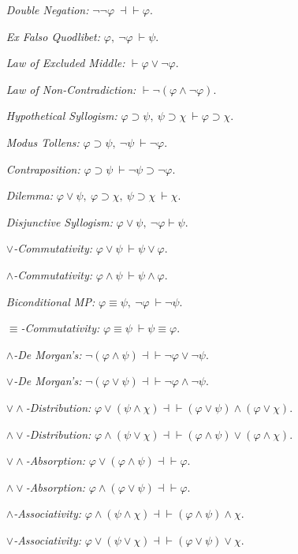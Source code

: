 \documentclass[a4paper, 11pt]{article} %
\begin{document}
\begin{enumerate}[leftmargin=1.5in]
  \item[\it Double Negation:] $\neg\neg\varphi\ \dashv\vdash \varphi$.
  \item[\it Ex Falso Quodlibet:] $\varphi,\ \neg\varphi\ \vdash \psi$.
  \item[\it Law of Excluded Middle:] $\vdash \varphi\vee\neg\varphi$.
  \item[\it Law of Non-Contradiction:] $\vdash \neg(\varphi\wedge\neg\varphi)$.
  \item[\it Hypothetical Syllogism:] $\varphi \supset \psi,\ \psi \supset \chi\ \vdash \varphi \supset \chi$.
  \item[\it Modus Tollens:] $\varphi \supset \psi,\ \neg\psi\ \vdash \neg\varphi$.
  \item[\it Contraposition:] $\varphi \supset \psi\ \vdash \neg\psi \supset \neg\varphi$.
  \item[\it Dilemma:] $\varphi \vee \psi,\ \varphi \supset \chi,\ \psi \supset \chi\ \vdash \chi$.
  \item[\it Disjunctive Syllogism:] $\varphi \vee \psi,\ \neg \varphi \vdash \psi$.
  \item[\it $\vee$-Commutativity:] $\varphi \vee \psi\ \vdash \psi \vee \varphi$.
  \item[\it $\wedge$-Commutativity:] $\varphi \wedge \psi\ \vdash \psi \wedge \varphi$.
  \item[\it Biconditional MP:] $\varphi \equiv \psi,\ \neg\varphi\ \vdash \neg\psi$.
  \item[\it $\equiv$-Commutativity:] $\varphi \equiv \psi\ \vdash \psi \equiv \varphi$.
  \item[\it $\wedge$-De Morgan's:] $\neg(\varphi\wedge\psi)\dashv\vdash\neg\varphi\vee\neg\psi$.
  \item[\it $\vee$-De Morgan's:] $\neg(\varphi\vee\psi)\dashv\vdash\neg\varphi\wedge\neg\psi$.
  \item[\it ${\vee}{\wedge}$-Distribution:] $\varphi\vee(\psi\wedge\chi) \dashv\vdash (\varphi\vee\psi)\wedge(\varphi\vee\chi)$.
  \item[\it ${\wedge}{\vee}$-Distribution:] $\varphi\wedge(\psi\vee\chi) \dashv\vdash (\varphi\wedge\psi)\vee(\varphi\wedge\chi)$.
  \item[\it ${\vee}{\wedge}$-Absorption:] $\varphi\vee(\varphi\wedge\psi) \dashv\vdash \varphi$.
  \item[\it ${\wedge}{\vee}$-Absorption:] $\varphi\wedge(\varphi\vee\psi) \dashv\vdash \varphi$.
  \item[\it $\wedge$-Associativity:] $\varphi\wedge(\psi\wedge\chi) \dashv\vdash (\varphi\wedge\psi)\wedge\chi$.
  \item[\it $\vee$-Associativity:] $\varphi\vee(\psi\vee\chi) \dashv\vdash (\varphi\vee\psi)\vee\chi$.
\end{enumerate}
\end{document}
